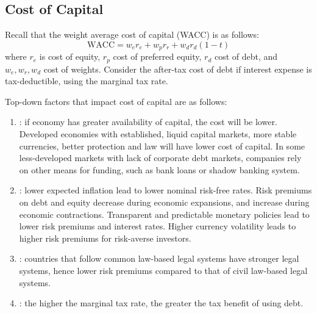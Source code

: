 \subsection{Cost of Capital}

Recall that the weight average cost of capital (WACC) is as follows:
\begin{equation}
\text{WACC} = w_e r_e + w_p r_r + w_d r_d (1-t) \nonumber 
\end{equation}
where $r_e$ is cost of equity, $r_p$ cost of preferred equity, $r_d$ cost of debt, and $w_e, w_r, w_d$ cost of weights. Consider the after-tax cost of debt if interest expense is tax-deductible, using the marginal tax rate.

\begin{remark} Top-down factors that impact cost of capital are as follows:
\begin{enumerate}[label=\roman*.]
\setlength{\itemsep}{0pt}
\item {}: if economy has greater availability of capital, the cost will be lower. Developed economies with established, liquid capital markets, more stable currencies, better protection and law will have lower cost of capital. In some less-developed markets with lack of corporate debt markets, companies rely on other means for funding, such as bank loans or shadow banking system.
\item {}: lower expected inflation lead to lower nominal risk-free rates. Risk premiums on debt and equity decrease during economic expansions, and increase during economic contractions. Transparent and predictable monetary policies lead to lower risk premiums and interest rates. Higher currency volatility leads to higher risk premiums for risk-averse investors.
\item {}: countries that follow common law-based legal systems have stronger legal systems, hence lower risk premiums compared to that of civil law-based legal systems.
\item {}: the higher the marginal tax rate, the greater the tax benefit of using debt.
\end{enumerate}
\end{remark}

